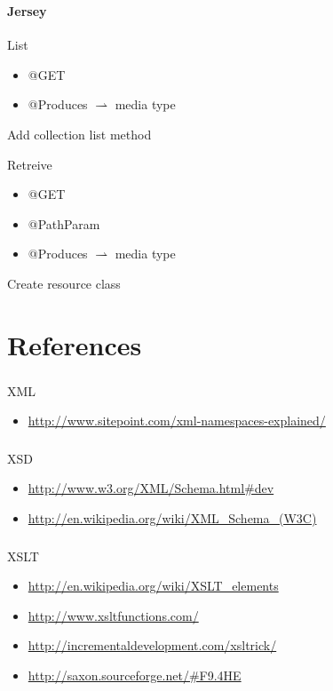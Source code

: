 \documentclass[handout]{beamer}
\begin{document}
\begin{frame}
	\frametitle{\insertsection}
	\framesubtitle{Jersey}
	\begin{block}{List}
		\begin{itemize}
			\item @GET
			\item @Produces $\rightharpoonup$ media type
		\end{itemize}
	\end{block}
	\begin{semiverbatim}
		Add collection list method
	\end{semiverbatim}
	\begin{block}{Retreive}
		\begin{itemize}
			\item @GET
			\item @PathParam
			\item @Produces $\rightharpoonup$ media type
		\end{itemize}
	\end{block}
	\begin{semiverbatim}
		Create resource class
	\end{semiverbatim}
\end{frame}

\section{References}

\begin{frame}
	\frametitle{\insertsection}
	XML\\
	\begin{itemize}
		\item \url{http://www.sitepoint.com/xml-namespaces-explained/}{}
	\end{itemize}
\end{frame}

\begin{frame}
	\frametitle{\insertsection}
	XSD\\
	\begin{itemize}
		\item \url{http://www.w3.org/XML/Schema.html\#dev}{}
		\item \url{http://en.wikipedia.org/wiki/XML_Schema_(W3C)}{}
	\end{itemize}
\end{frame}

\begin{frame}
	\frametitle{\insertsection}
	XSLT\\
	\begin{itemize}
		\item \url{http://en.wikipedia.org/wiki/XSLT_elements}{}
		\item \url{http://www.xsltfunctions.com/}{}
		\item \url{http://incrementaldevelopment.com/xsltrick/}{}
		\item \url{http://saxon.sourceforge.net/\#F9.4HE}{}
	\end{itemize}
\end{frame}
\end{document}
